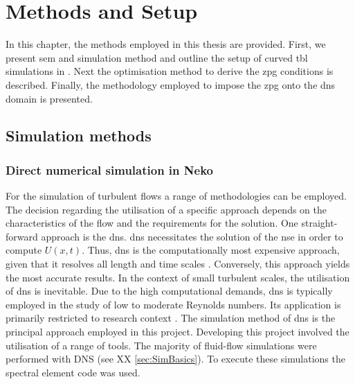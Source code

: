 
\chapter{Methods and Setup} \label{chap:methods and Setup}



In this chapter, the methods employed in this thesis are provided. 
First, we present \acrfull{sem} and simulation method and outline the setup of curved \acrshort{tbl} simulations in .
Next the optimisation method to derive the \acrshort{zpg} conditions is described.
Finally, the methodology employed to impose the \acrshort{zpg} onto the \acrshort{dns} domain is presented.

\section{Simulation methods}\label{sec:SimMethods}

\subsection{Direct numerical simulation in Neko}\label{subsec:DNSmethod}

For the simulation of turbulent flows a range of methodologies can be employed.
The decision regarding the utilisation of a specific approach  depends on the characteristics of the flow and the requirements for the solution.
One straight-forward approach is the \acrshort{dns}.
\acrshort{dns} necessitates the solution of the \acrshort{nse} in order to compute  $U(x,t)$.
Thus, \acrshort{dns} is the computationally most expensive approach, given that it resolves all length and time scales \citep{pope_turbulent_2015}.  Conversely, this approach yields  the most accurate results.
In the context of small turbulent scales, the utilisation of \acrshort{dns} is inevitable.
Due to the high computational demands, \acrshort{dns} is typically employed in the study of low to moderate Reynolds numbers. Its application is primarily restricted to research context \citep{slotnick_cfd_nodate}.
The simulation method of \acrshort{dns} is the principal approach employed in this project.
Developing this project involved the utilisation of a range of tools. The majority of fluid-flow simulations were performed with DNS (see XX \autoref{sec:SimBasics}). To execute these simulations the spectral element code  was used. 

